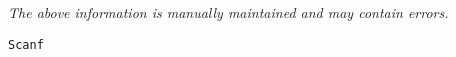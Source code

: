 \label{pkg:scanf}

{\tiny \it The above information is manually maintained and may contain errors.}
\begin{verbatim}
Scanf
\end{verbatim}
